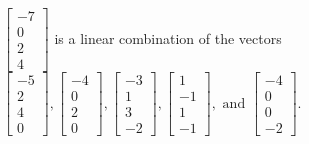 \begin{exercise}
\begin{exerciseStatement}
  \end{exerciseStatement}
  \begin{exerciseAnswer}
   \(\left[\begin{array}{c}
-7 \\
0 \\
2 \\
4
\end{array}\right]\) 
  	 is  
	a linear combination of the vectors \(\left[\begin{array}{c}
-5 \\
2 \\
4 \\
0
\end{array}\right] , \left[\begin{array}{c}
-4 \\
0 \\
2 \\
0
\end{array}\right] , \left[\begin{array}{c}
-3 \\
1 \\
3 \\
-2
\end{array}\right] , \left[\begin{array}{c}
1 \\
-1 \\
1 \\
-1
\end{array}\right] , \text{ and } \left[\begin{array}{c}
-4 \\
0 \\
0 \\
-2
\end{array}\right]\).

	
  


  \end{exerciseAnswer}
\end{exercise}